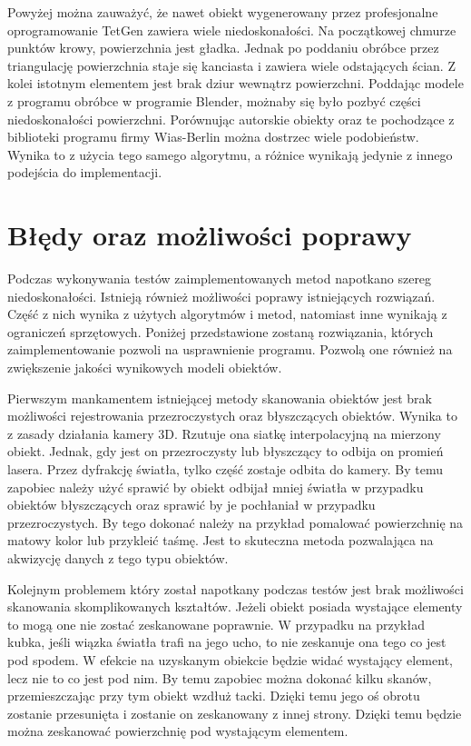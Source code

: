 Powyżej można zauważyć, że nawet obiekt wygenerowany przez profesjonalne oprogramowanie TetGen zawiera wiele niedoskonałości. Na początkowej chmurze punktów krowy, powierzchnia jest gładka. Jednak po poddaniu obróbce przez triangulację powierzchnia staje się kanciasta i zawiera wiele odstających ścian. Z kolei istotnym elementem jest brak dziur wewnątrz powierzchni. Poddając modele z programu obróbce w programie Blender, możnaby się było pozbyć części niedoskonałości powierzchni. Porównując autorskie obiekty oraz te pochodzące z biblioteki programu firmy Wias-Berlin można dostrzec wiele podobieństw. Wynika to z użycia tego samego algorytmu, a różnice wynikają jedynie z innego podejścia do implementacji.


\section{Błędy oraz możliwości poprawy}
Podczas wykonywania testów zaimplementowanych metod napotkano szereg niedoskonałości. Istnieją również możliwości poprawy istniejących rozwiązań. Część z nich wynika z użytych algorytmów i metod, natomiast inne wynikają z ograniczeń sprzętowych. Poniżej przedstawione zostaną rozwiązania, których zaimplementowanie pozwoli na usprawnienie programu. Pozwolą one również na zwiększenie jakości wynikowych modeli obiektów.

Pierwszym mankamentem istniejącej metody skanowania obiektów jest brak możliwości rejestrowania przezroczystych oraz błyszczących obiektów. Wynika to z zasady działania kamery 3D. Rzutuje ona siatkę interpolacyjną na mierzony obiekt. Jednak, gdy jest on przezroczysty lub błyszczący to odbija on promień lasera. Przez dyfrakcję światła, tylko część zostaje odbita do kamery. By temu zapobiec należy użyć sprawić by obiekt odbijał mniej światła w przypadku obiektów błyszczących oraz sprawić by je pochłaniał w przypadku przezroczystych. By tego dokonać należy na przykład pomalować powierzchnię na matowy kolor lub przykleić taśmę. Jest to skuteczna metoda pozwalająca na akwizycję danych z tego typu obiektów. 

Kolejnym problemem który został napotkany podczas testów jest brak możliwości skanowania skomplikowanych kształtów. Jeżeli obiekt posiada wystające elementy to mogą one nie zostać zeskanowane poprawnie. W przypadku na przykład kubka, jeśli wiązka światła trafi na jego ucho, to nie zeskanuje ona tego co jest pod spodem. W efekcie na uzyskanym obiekcie będzie widać wystający element, lecz nie to co jest pod nim. By temu zapobiec można dokonać kilku skanów, przemieszczając przy tym obiekt wzdłuż tacki. Dzięki temu jego oś obrotu zostanie przesunięta i zostanie on zeskanowany z innej strony. Dzięki temu będzie można zeskanować powierzchnię pod wystającym elementem.

